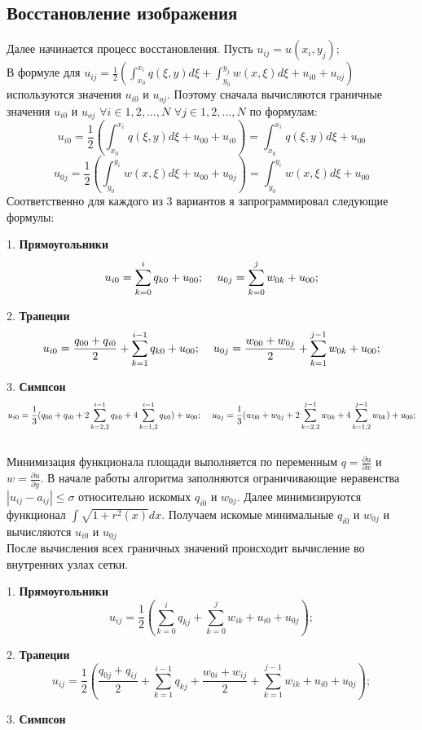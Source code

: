 \documentclass{report}
\newcommand{\ttt}{\hspace*{4mm}}
\begin{document}
\subsection*{Восстановление изображения}
\ttt Далее начинается процесс восстановления. Пусть
$ u_{ij} = u(x_i,y_j);$
\\
В формуле для $u_{ij} = \frac{1}{2}(\int_{x_0}^{x_i} q(\xi, y)d\xi + \int_{y_0}^{y_j} w(x, \xi)d\xi + u_{i0} + u_{oj})$ используются значения $u_{i0}$ и $u_{oj}$. Поэтому сначала вычисляются граничные значения $u_{i0}$ и $u_{oj}$  $\forall i \in 1, 2, ...,N$ $\forall j \in 1, 2, ...,N$ по формулам:
$$ u_{i0} = \frac{1}{2}(\int_{x_0}^{x_i} q(\xi, y)d\xi + u_{00} + u_{i0}) = \int_{x_0}^{x_i} q(\xi, y)d\xi + u_{00}$$
$$ u_{0j} = \frac{1}{2}(\int_{y_0}^{y_i} w(x, \xi)d\xi + u_{00} + u_{0j}) = \int_{y_0}^{y_i} w(x, \xi)d\xi + u_{00}$$
Соответственно для каждого из 3 вариантов я запрограммировал следующие формулы:
\item 1. \textbf{Прямоугольники}
	$$ u_{i0} = \sum_{k=0}^{i}q_{k0} + u_{00};\ttt u_{0j} = \sum_{k=0}^{j}w_{0k} + u_{00};$$
\item 2. \textbf{Трапеции}
	$$ u_{i0} = \frac{q_{00} + q_{i0}}{2} + \sum_{k=1}^{i-1}q_{k0} + u_{00};\ttt u_{0j} = \frac{w_{00} + w_{0j}}{2} +  \sum_{k=1}^{j-1}w_{0k} + u_{00};$$
\item 3. \textbf{Симпсон}
	$$ u_{i0} = \frac{1}{3} (q_{00} + q_{i0} + 2\sum_{k=2,2}^{i-1}q_{k0} + 4\sum_{k=1,2}^{i-1}q_{k0} )+ u_{00};\ttt u_{0j} = \frac{1}{3} (w_{00} + w_{0j} + 2\sum_{k=2,2}^{j-1}w_{0k} + 4\sum_{k=1,2}^{j-1}w_{0k} )+ u_{00};$$
\\
\ttt Минимизация функционала площади выполняется по переменным $q = \frac{\partial u}{\partial x}$ и $w = \frac{\partial u}{\partial y}$. В начале работы алгоритма заполняются ограничивающие неравенства $|u_{ij} - a_{ij}| \leq \sigma$ относительно искомых $q_{i0}$ и $w_{0j}$. Далее минимизируются функционал  $\int\sqrt{1+r^2(x)}dx$. Получаем искомые минимальные $q_{i0}$ и $w_{0j}$ и вычисляются $u_{i0}$ и $u_{0j}$\\
\ttt После вычисления всех граничных значений происходит вычисление во внутренних узлах сетки.
\item 1. \textbf{Прямоугольники}
	$$ u_{ij} = \frac{1}{2}( \sum_{k=0}^{i}q_{kj} + \sum_{k=0}^{j}w_{ik} + u_{i0} + u_{0j});$$
\item 2. \textbf{Трапеции}
	$$ u_{ij} = \frac{1}{2}(\frac{q_{0j} + q_{ij}}{2} +\sum_{k=1}^{i-1}q_{kj} + \frac{w_{0i} + w_{ij}}{2}+\sum_{k=1}^{j-1}w_{ik} + u_{i0} + u_{0j});$$
\item 3. \textbf{Симпсон}
\end{document}
